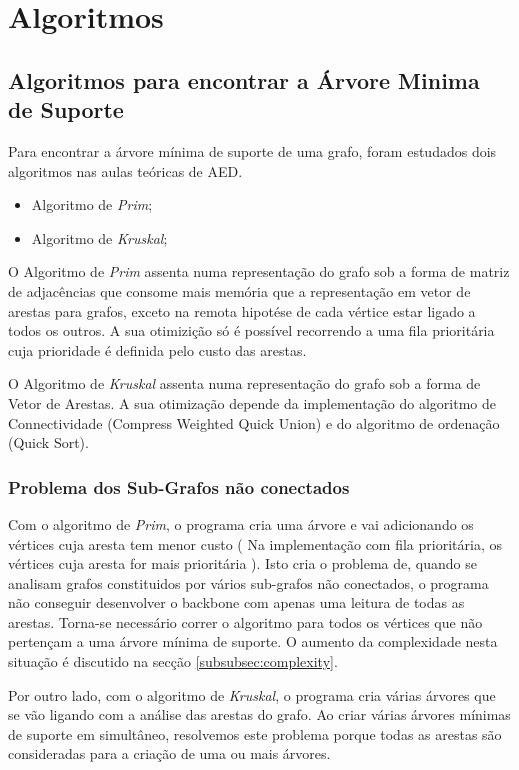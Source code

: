 \documentclass[14pt]{article}
\begin{document}
    \section[Algoritmos]{Algoritmos}\label{sec:algoritmos}
    \subsection[mstfind]{Algoritmos para encontrar a Árvore Minima de Suporte}\label{subsec:mstfind}
    Para encontrar a árvore mínima de suporte de uma grafo, foram estudados dois algoritmos nas aulas teóricas de AED.
    \begin{itemize}
        \item Algoritmo de \emph{Prim};
        \item Algoritmo de \emph{Kruskal};
    \end{itemize}

    O Algoritmo de \emph{Prim} assenta numa representação do grafo sob a forma de matriz de adjacências que consome mais memória que a
    representação em vetor de arestas para grafos, exceto na remota hipotése de cada vértice estar ligado a todos os outros.
    A sua otimizição só é possível recorrendo a uma fila prioritária cuja prioridade é definida pelo custo das arestas.

    O Algoritmo de \emph{Kruskal} assenta numa representação do grafo sob a forma de Vetor de Arestas. A sua otimização depende
    da implementação do algoritmo de Connectividade (Compress Weighted Quick Union) e do algoritmo de ordenação (Quick Sort).

    \subsubsection[subgraphpb]{Problema dos Sub-Grafos não conectados}\label{subsubsec:subgraphpb}
    Com o algoritmo de \emph{Prim}, o programa cria uma árvore e vai adicionando os vértices cuja aresta tem menor custo ( Na implementação com
    fila prioritária, os vértices cuja aresta for mais prioritária ). Isto cria o problema de, quando se analisam grafos constituidos por
    vários sub-grafos não conectados, o programa não conseguir desenvolver o backbone com apenas uma leitura de todas as arestas. Torna-se
    necessário correr o algoritmo para todos os vértices que não pertençam a uma árvore mínima de suporte. O aumento da complexidade nesta
    situação é discutido na secção \ref{subsubsec:complexity}.

    Por outro lado, com o algoritmo de \emph{Kruskal}, o programa cria várias árvores que se vão ligando com a análise das arestas do grafo. Ao criar
    várias árvores mínimas de suporte em simultâneo, resolvemos este problema porque todas as arestas são consideradas para a criação de uma ou
    mais árvores.
    
\end{document}
